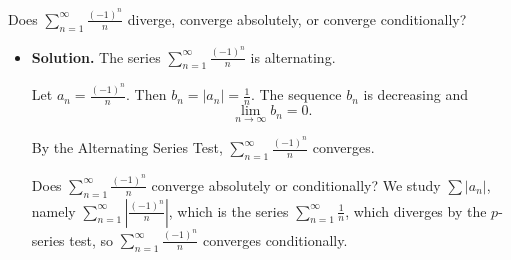 \documentclass{article}
\begin{document}
\noindent
Does $\displaystyle \sum_{n=1}^\infty \frac{(-1)^n}n$
diverge, converge absolutely, or converge conditionally?

\begin{itemize}

\item {\bf Solution.} The series $\displaystyle \sum_{n=1}^\infty \frac{(-1)^n}n$ is alternating.

Let $a_n = \frac{(-1)^n}{n}$. Then $b_n = |a_n| = \frac1n$. The sequence $b_n$ is decreasing and 
\[ \lim_{n \rightarrow \infty} b_n = 0.\]

By the Alternating Series Test,
$\displaystyle \sum_{n=1}^\infty \frac{(-1)^n}n$
converges.

Does $\displaystyle \sum_{n=1}^\infty \frac{(-1)^n}n$ converge absolutely or conditionally?
We study $\sum |a_n|$, namely $\displaystyle \sum_{n=1}^\infty \left|\frac{(-1)^n}n\right|$, which is the series 
$\displaystyle \sum_{n=1}^\infty \frac{1}n$, which diverges by the $p$-series test, so 
$\displaystyle \sum_{n=1}^\infty \frac{(-1)^n}n$ converges conditionally.

\end{itemize}
\end{document}
